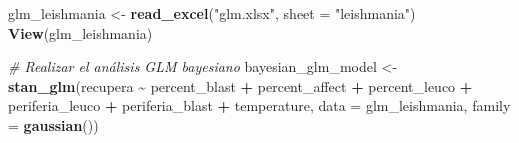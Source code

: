 \documentclass[
]{article}
\newenvironment{Shaded}{\begin{snugshade}}{\end{snugshade}}
\newcommand{\AttributeTok}[1]{\textcolor[rgb]{0.13,0.29,0.53}{#1}}
\newcommand{\CommentTok}[1]{\textcolor[rgb]{0.56,0.35,0.01}{\textit{#1}}}
\newcommand{\FunctionTok}[1]{\textcolor[rgb]{0.13,0.29,0.53}{\textbf{#1}}}
\newcommand{\NormalTok}[1]{#1}
\newcommand{\OtherTok}[1]{\textcolor[rgb]{0.56,0.35,0.01}{#1}}
\newcommand{\SpecialCharTok}[1]{\textcolor[rgb]{0.81,0.36,0.00}{\textbf{#1}}}
\newcommand{\StringTok}[1]{\textcolor[rgb]{0.31,0.60,0.02}{#1}}
\begin{document}
\begin{Shaded}
\begin{Highlighting}[]
\NormalTok{glm\_leishmania }\OtherTok{\textless{}{-}} \FunctionTok{read\_excel}\NormalTok{(}\StringTok{"glm.xlsx"}\NormalTok{, }\AttributeTok{sheet =} \StringTok{"leishmania"}\NormalTok{)}
\FunctionTok{View}\NormalTok{(glm\_leishmania)}

\CommentTok{\# Realizar el análisis GLM bayesiano}
\NormalTok{bayesian\_glm\_model }\OtherTok{\textless{}{-}} \FunctionTok{stan\_glm}\NormalTok{(recupera }\SpecialCharTok{\textasciitilde{}}\NormalTok{ percent\_blast }\SpecialCharTok{+}\NormalTok{ percent\_affect }\SpecialCharTok{+}\NormalTok{ percent\_leuco }\SpecialCharTok{+}\NormalTok{ periferia\_leuco }\SpecialCharTok{+}\NormalTok{ periferia\_blast }\SpecialCharTok{+}\NormalTok{ temperature, }\AttributeTok{data =}\NormalTok{ glm\_leishmania, }\AttributeTok{family =} \FunctionTok{gaussian}\NormalTok{())}
\end{Highlighting}
\end{Shaded}
\end{document}
